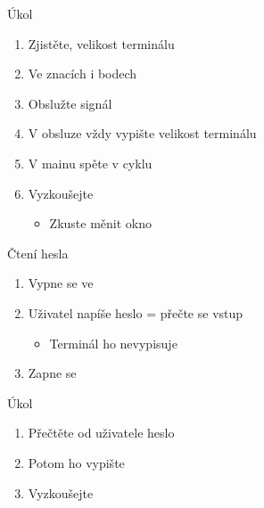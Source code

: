 \begin{frame}{Úkol}

  \begin{enumerate}
    \item Zjistěte, velikost terminálu
    \item Ve znacích i bodech
    \item Obslužte signál 
    \item V obsluze vždy vypište velikost terminálu
    \item V mainu spěte v cyklu
    \item Vyzkoušejte
    \begin{itemize}
      \item Zkuste měnit okno
    \end{itemize}
  \end{enumerate}

\end{frame}

\begin{frame}{Čtení hesla}


  \pause

  \begin{enumerate}
    \item Vypne se  ve 

    \pause

    \item Uživatel napíše heslo = přečte se vstup
    \begin{itemize}
      \item Terminál ho nevypisuje
    \end{itemize}

    \pause

    \item Zapne se 
  \end{enumerate}

\end{frame}

\begin{frame}{Úkol}

  \begin{enumerate}
    \item Přečtěte od uživatele heslo
    \item Potom ho vypište
    \item Vyzkoušejte
  \end{enumerate}

\end{frame}

